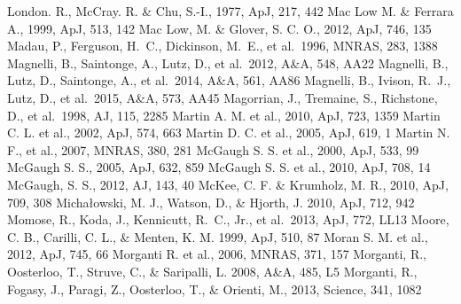 \begin{thebibliography}{99}
\begin{multicols}{2}
{
	London. R., McCray. R. \& Chu, S.-I., 1977, ApJ, 217, 442
	Mac Low M. \& Ferrara A., 1999, ApJ, 513, 142
	Mac Low, M. \& Glover, S. C. O., 2012, ApJ, 746, 135
	Madau, P., Ferguson, H.~C., Dickinson, M.~E., et al.\ 1996, MNRAS, 283, 1388 
	Magnelli, B., Saintonge, A., Lutz, D., et al.\ 2012, A\&A, 548, AA22 
	Magnelli, B., Lutz, D., Saintonge, A., et al.\ 2014, A\&A, 561, AA86 
	Magnelli, B., Ivison, R.~J., Lutz, D., et al.\ 2015, A\&A, 573, AA45 
	Magorrian, J., Tremaine, S., Richstone, D., et al.\ 1998, AJ, 115, 2285 
	Martin A. M. et al., 2010, ApJ, 723, 1359
	Martin C. L. et al., 2002, ApJ, 574, 663
	Martin D. C. et al., 2005, ApJ, 619, 1
	Martin N. F., et al., 2007, MNRAS, 380, 281
	McGaugh S. S. et al., 2000, ApJ, 533, 99
	McGaugh S. S., 2005, ApJ, 632, 859
	McGaugh S. S. et al., 2010, ApJ, 708, 14
	McGaugh, S. S., 2012, AJ, 143, 40
	McKee, C. F. \& Krumholz, M. R., 2010, ApJ, 709, 308
    	Micha{\l}owski, M. J., Watson, D., \& Hjorth, J. 2010, ApJ, 712, 942
	Momose, R., Koda, J., Kennicutt, R.~C., Jr., et al.\ 2013, ApJ, 772, LL13 
    	Moore, C. B., Carilli, C. L., \& Menten, K. M. 1999, ApJ, 510, 87
	Moran S. M. et al., 2012, ApJ, 745, 66
	Morganti R. et al., 2006, MNRAS, 371, 157
    	Morganti, R., Oosterloo, T., Struve, C., \& Saripalli, L. 2008, A\&A, 485, L5
    	Morganti, R., Fogasy, J., Paragi, Z., Oosterloo, T., \&  Orienti, M., 2013, Science, 341, 1082
}
\end{multicols}
\end{thebibliography}
